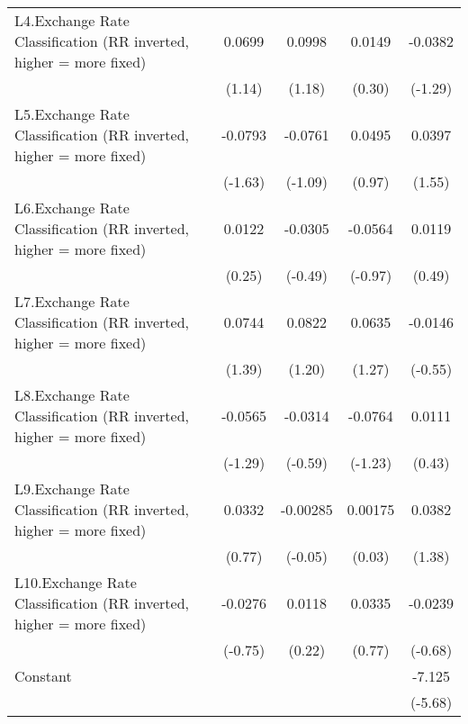 {\begin{longtable}{l*{4}{c}}
\addlinespace
L4.Exchange Rate Classification (RR inverted, higher = more fixed)&   0.0699         &   0.0998         &   0.0149         &  -0.0382         \\
                &   (1.14)         &   (1.18)         &   (0.30)         &  (-1.29)         \\
\addlinespace
L5.Exchange Rate Classification (RR inverted, higher = more fixed)&  -0.0793         &  -0.0761         &   0.0495         &   0.0397         \\
                &  (-1.63)         &  (-1.09)         &   (0.97)         &   (1.55)         \\
\addlinespace
L6.Exchange Rate Classification (RR inverted, higher = more fixed)&   0.0122         &  -0.0305         &  -0.0564         &   0.0119         \\
                &   (0.25)         &  (-0.49)         &  (-0.97)         &   (0.49)         \\
\addlinespace
L7.Exchange Rate Classification (RR inverted, higher = more fixed)&   0.0744         &   0.0822         &   0.0635         &  -0.0146         \\
                &   (1.39)         &   (1.20)         &   (1.27)         &  (-0.55)         \\
\addlinespace
L8.Exchange Rate Classification (RR inverted, higher = more fixed)&  -0.0565         &  -0.0314         &  -0.0764         &   0.0111         \\
                &  (-1.29)         &  (-0.59)         &  (-1.23)         &   (0.43)         \\
\addlinespace
L9.Exchange Rate Classification (RR inverted, higher = more fixed)&   0.0332         & -0.00285         &  0.00175         &   0.0382         \\
                &   (0.77)         &  (-0.05)         &   (0.03)         &   (1.38)         \\
\addlinespace
L10.Exchange Rate Classification (RR inverted, higher = more fixed)&  -0.0276         &   0.0118         &   0.0335         &  -0.0239         \\
                &  (-0.75)         &   (0.22)         &   (0.77)         &  (-0.68)         \\
\addlinespace
Constant        &                  &                  &                  &   -7.125\sym{***}\\
                &                  &                  &                  &  (-5.68)         \\

\end{longtable}}
